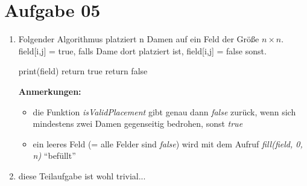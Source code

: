 \documentclass[10pt,a4paper]{article}
\begin{document}
\section*{Aufgabe 05}

    \begin{enumerate}[label={\alph*)}]
        \item
        Folgender Algorithmus platziert n Damen auf ein Feld der Größe $n \times n$.
        field[i,j] = true, falls Dame dort platziert ist, field[i,j] = false sonst. \\
        \begin{algorithm}[H]
         
             {
                 {
                    print(field)\;
                    return true\;
                }
                return false\;
            }
         
        \end{algorithm}
        
        \textbf{Anmerkungen: }
        \begin{itemize}
            \item die Funktion \textit{isValidPlacement} gibt genau dann \textit{false}
                zurück, wenn sich mindestens zwei Damen gegenseitig bedrohen,
                sonst \textit{true}
            \item ein leeres Feld (= alle Felder sind \textit{false}) wird mit dem 
                Aufruf \textit{fill(field, 0, n)} ``befüllt'' 
        \end{itemize}
        
         \item diese Teilaufgabe ist wohl trivial...

        
    \end{enumerate}
\end{document}
